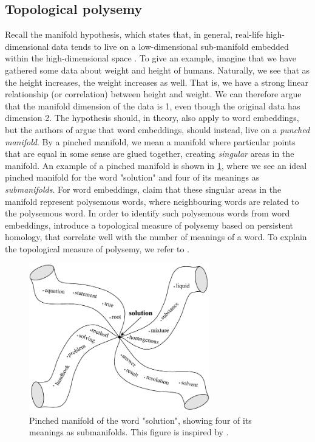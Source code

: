 \subsection{Topological polysemy}
\label{sec:topological-polysemy}
Recall the manifold hypothesis, which states that, in general, real-life high-dimensional data tends to live on a low-dimensional sub-manifold embedded within the high-dimensional space \cite[p. 16]{bengio2014representation}. To give an example, imagine that we have gathered some data about weight and height of humans. Naturally, we see that as the height increases, the weight increases as well. That is, we have a strong linear relationship (or correlation) between height and weight. We can therefore argue that the manifold dimension of the data is 1, even though the original data has dimension 2. The hypothesis should, in theory, also apply to word embeddings, but the authors of \cite{jakubowski2020topology} argue that word embeddings, should instead, live on a \textit{punched manifold}. By a pinched manifold, we mean a manifold where particular points that are equal in some sense are glued together, creating \textit{singular} areas in the manifold. An example of a pinched manifold is shown in \cref{fig:pinched-manifold}, where we see an ideal pinched manifold for the word "solution" and four of its meanings as \textit{submanifolds}. For word embeddings, \cite{jakubowski2020topology} claim that these singular areas in the manifold represent polysemous words, where neighbouring words are related to the polysemous word. In order to identify such polysemous words from word embeddings, \cite{jakubowski2020topology} introduce a topological measure of polysemy based on persistent homology, that correlate well with the number of meanings of a word. To explain the topological measure of polysemy, we refer to \cite{jakubowski2020topology}.
\begin{figure}[H]
    \centering
    \includegraphics[width=0.7\textwidth]{thesis/figures/pinched-manifold_cropped.pdf}
    \caption{Pinched manifold of the word "solution", showing four of its meanings as submanifolds. This figure is inspired by \cite[Figure 5]{jakubowski2020topology}.}
    \label{fig:pinched-manifold}
\end{figure}

